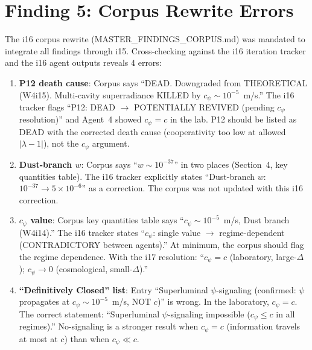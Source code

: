 \documentclass[11pt]{article}
\newcommand{\ee}[1]{\times 10^{#1}}
\begin{document}
\part{Finding 5: Corpus Rewrite Errors}
\label{part:corpus}

The i16 corpus rewrite (MASTER\_FINDINGS\_CORPUS.md) was mandated to
integrate all findings through i15. Cross-checking against the i16
iteration tracker and the i16 agent outputs reveals 4 errors:

\begin{enumerate}
\item \textbf{P12 death cause}: Corpus says ``DEAD. Downgraded from
  THEORETICAL (W4i15). Multi-cavity superradiance KILLED by $c_\psi
  \sim 10^{-5}$~m/s.'' The i16 tracker flags ``P12: DEAD $\to$
  POTENTIALLY REVIVED (pending $c_\psi$ resolution)'' and Agent~4
  showed $c_\psi = c$ in the lab. P12 should be listed as DEAD with
  the corrected death cause (cooperativity too low at allowed
  $|\lambda-1|$), not the $c_\psi$ argument.

\item \textbf{Dust-branch $w$}: Corpus says ``$w \sim 10^{-37}$''
  in two places (Section~4, key quantities table). The i16 tracker
  explicitly states ``Dust-branch $w$: $10^{-37} \to 5\ee{-6}$''
  as a correction. The corpus was not updated with this i16 correction.

\item \textbf{$c_\psi$ value}: Corpus key quantities table says
  ``$c_\psi \sim 10^{-5}$~m/s, Dust branch (W4i14).'' The i16
  tracker states ``$c_\psi$: single value $\to$ regime-dependent
  (CONTRADICTORY between agents).'' At minimum, the corpus should
  flag the regime dependence. With the i17 resolution: ``$c_\psi = c$
  (laboratory, large-$\Delta$); $c_\psi \to 0$ (cosmological,
  small-$\Delta$).''

\item \textbf{``Definitively Closed'' list}: Entry ``Superluminal
  $\psi$-signaling (confirmed: $\psi$ propagates at $c_\psi \sim
  10^{-5}$~m/s, NOT $c$)'' is wrong. In the laboratory,
  $c_\psi = c$. The correct statement: ``Superluminal
  $\psi$-signaling impossible ($c_\psi \leq c$ in all regimes).''
  No-signaling is a stronger result when $c_\psi = c$ (information
  travels at most at $c$) than when $c_\psi \ll c$.
\end{enumerate}
\end{document}
